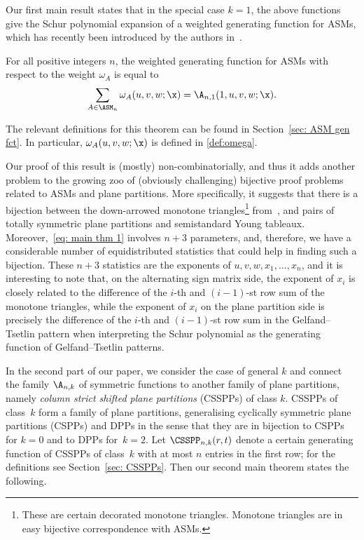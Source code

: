 Our first main result states that in the special case $k=1$, the above functions give the Schur polynomial expansion of a weighted generating function for ASMs, which has recently been introduced by the authors in~\cite{FischerSchreierAigner23}.

\begin{thm}
\label{thm: main thm 1}
For all positive integers $n$, the weighted generating function for ASMs with respect to the weight $\omega_A$ is equal to
\begin{equation}
\label{eq: main thm 1}
\sum_{A \in \ASM_n} \omega_A(u,v,w;\x) = \A_{n,1}(1, u,v,w;\x).
\end{equation}
\end{thm}
The relevant definitions for this theorem can be found in Section~\ref{sec: ASM gen fct}. In particular, $\omega_A(u,v,w;\x)$ is defined in 
\eqref{def:omega}.

Our proof of this result is (mostly) non-combinatorially, and thus it adds another problem to the growing zoo of (obviously challenging) bijective proof problems related to ASMs and plane partitions. More specifically, it suggests that there is a bijection between the down-arrowed monotone triangles\footnote{These are certain decorated monotone triangles. Monotone triangles are in easy bijective correspondence with ASMs.} from~\cite{FischerSchreierAigner23}, and pairs of totally symmetric plane partitions and semistandard Young tableaux. Moreover,~\eqref{eq: main thm 1} involves $n+3$ parameters, and, therefore, we have a considerable number of equidistributed statistics that could help in finding such a bijection. These $n+3$ statistics are the exponents of $u,v,w,x_1,\ldots,x_n$, and
it is interesting to note that, on the alternating sign matrix side, 
the exponent of $x_i$ is closely related to the difference of the $i$-th and $(i-1)$-st row sum of the monotone triangles, while the exponent of $x_i$ on the plane partition side is precisely the  difference of the $i$-th and $(i-1)$-st row sum in the Gelfand--Tsetlin pattern when interpreting the Schur polynomial as the generating function of Gelfand--Tsetlin patterns.

In the second part of our paper, we consider the case of general $k$ and connect the family $\A_{n,k}$ of symmetric functions to another family of plane partitions, namely \emph{column strict shifted plane partitions} (CSSPPs) of class $k$. CSSPPs of class~$k$ form a family of plane partitions, generalising cyclically symmetric plane partitions (CSPPs) and DPPs in the sense that they are in bijection to CSPPs for $k=0$ and to DPPs for~$k=2$. 
Let $\CSSPP_{n,k}(r,t)$ denote a certain generating function of CSSPPs of class~$k$ with at most $n$ entries in the first row; for the definitions see Section~\ref{sec: CSSPPs}. Then our second main theorem states the following.

